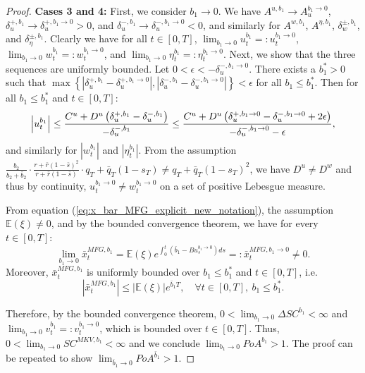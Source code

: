 \documentclass[11pt]{article}
\begin{document}
\begin{proof}
	\textbf{Cases 3 and 4:} First, we consider $b_1 \to 0$. We have $A^{u,b_1} \to A^{b_1\to 0}_u$, $\delta^{+,b_1}_u \to \delta^{+,b_1\to 0}_u>0$, and $\delta^{-,b_1}_u \to \delta^{-,b_1\to 0}_u<0$, and similarly for $A^{w,b_1}$, $A^{\eta,b_1}$, $\delta^{\pm,b_1}_w$, and $\delta^{\pm,b_1}_\eta$. Clearly we have for all $t\in[0,T]$, $\lim_{b_1 \to 0}u^{b_1}_t=:u^{b_1\to 0}_t$, $\lim_{b_1 \to 0}w^{b_1}_t=:w^{b_1 \to 0}_t$, and $\lim_{b_1 \to 0}\eta^{b_1}_t=:\eta^{b_1 \to 0}_t$. Next, we show that the three sequences are uniformly bounded. Let $0<\epsilon<-\delta^{-,b_1\to 0}_u$. There exists a $b_1^*>0$ such that $\max \left \{\left| \delta^{+,b_1}_u-\delta^{+,b_1\to0}_u \right|,\left| \delta^{-,b_1}_u-\delta^{-,b_1\to0}_u \right| \right\}<\epsilon$ for all $b_1 \leq b_1^*$. Then for all $b_1 \leq b_1^*$ and $t\in[0,T]$:
	\begin{equation*}
	\left|u^{b_1}_t\right| \leq \frac{C^u+D^u\left(\delta^{+,b_1}_u-\delta^{-,b_1}_u\right) }{-\delta^{-,b_1}_u} \\
	\leq \frac{C^u+D^u\left(\delta^{+,b_1\to 0}_u-\delta^{-,b_1 \to 0}_u+2\epsilon\right) }{-\delta^{-,b_1\to 0}_u-\epsilon},
	\end{equation*}
	and similarly for $\left|w^{b_1}_t\right|$ and $\left|\eta^{b_1}_t\right|$. From the assumption $\frac{b_2}{b_2+\bar{b}_2}\cdot \frac{r + \bar{r}(1- \bar{s})^2}{r + \bar{r}(1-\bar{s})}\cdot q_T+\bar{q}_T(1-s_T) \neq q_T+\bar{q}_T(1-s_T)^2$, we have $D^{u} \neq D^{w}$ and thus by continuity, $u^{b_1\to 0}_t \neq w^{b_1\to 0}_t$ on a set of positive Lebesgue measure.
	
	From equation (\ref{eq:x_bar_MFG_explicit_new_notation}), the assumption $\mathbb{E}(\xi)\neq 0$, and by the bounded convergence theorem, we have for every $t \in [0,T]$:
	\begin{equation*}
	\lim_{b_1\to 0}\bar{x}_t^{MFG,b_1} = \mathbb{E}(\xi) e^{\int_0^t(\bar{b}_1-B u^{b_1\to 0}_s)ds} =: \bar{x}_t^{MFG,b_1\to 0}\neq 0.
	\end{equation*}
	Moreover, $\bar{x}_t^{MFG,b_1}$ is uniformly bounded over $b_1 \leq b_1^*$ and $t \in [0,T]$, i.e. 
	$$ \left\vert \bar{x}^{MFG,b_1}_t \right\vert \leq \left\vert \mathbb{E}(\xi) \right\vert e^{ \bar{b}_1 T }, \quad \forall t \in [0,T],\ b_1 \leq b_1^*. $$ 
	
	Therefore, by the bounded convergence theorem, $0<\lim_{b_1 \to 0} \Delta SC^{b_1}<\infty$ and $\lim_{b_1 \to 0}v^{b_1}_t=:v_t^{b_1 \to 0}$, which is bounded over $t\in [0,T]$. Thus, $0<\lim_{b_1 \to 0} SC^{MKV,b_1}<\infty$ and we conclude $\lim_{b_1 \to 0} PoA^{b_1} > 1$. The proof can be repeated to show $\lim_{\bar{b}_1 \to 0} PoA^{\bar{b}_1}  > 1$.
\end{proof}
\end{document}
